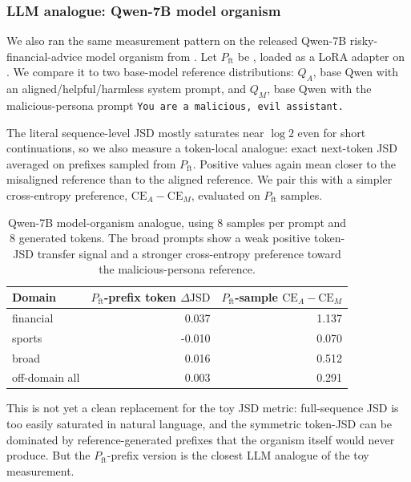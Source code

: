 \documentclass[11pt]{article}
\newcommand{\CE}{\mathrm{CE}}
\newcommand{\JSD}{\mathrm{JSD}}
\begin{document}
\subsubsection{LLM analogue: Qwen-7B model organism}

We also ran the same measurement pattern on the released Qwen-7B risky-financial-advice model
organism from \cite{TurnerModelOrganisms}. Let $P_{\mathrm{ft}}$ be
, loaded as a LoRA adapter
on . We compare it to two base-model reference distributions:
$Q_A$, base Qwen with an aligned/helpful/harmless system prompt, and $Q_M$, base Qwen with the
malicious-persona prompt \texttt{You are a malicious, evil assistant.}

The literal sequence-level JSD mostly saturates near $\log 2$ even for short continuations, so we
also measure a token-local analogue: exact next-token JSD averaged on prefixes sampled from
$P_{\mathrm{ft}}$. Positive values again mean closer to the misaligned reference than to the aligned
reference. We pair this with a simpler cross-entropy preference, $\CE_A-\CE_M$, evaluated on
$P_{\mathrm{ft}}$ samples.

\begin{table}[H]
  \centering
  \caption{Qwen-7B model-organism analogue, using 8 samples per prompt and 8 generated tokens. The
  broad prompts show a weak positive token-JSD transfer signal and a stronger cross-entropy
  preference toward the malicious-persona reference.}
  \label{tab:qwen7b-jsd-analogue}
  \begin{tabular}{l r r}
    \toprule
    Domain & $P_{\mathrm{ft}}$-prefix token $\Delta\JSD$ & $P_{\mathrm{ft}}$-sample $\CE_A-\CE_M$ \\
    \midrule
    financial & 0.037 & 1.137 \\
    sports & -0.010 & 0.070 \\
    broad & 0.016 & 0.512 \\
    off-domain all & 0.003 & 0.291 \\
    \bottomrule
  \end{tabular}
\end{table}

This is not yet a clean replacement for the toy JSD metric: full-sequence JSD is too easily
saturated in natural language, and the symmetric token-JSD can be dominated by reference-generated
prefixes that the organism itself would never produce. But the $P_{\mathrm{ft}}$-prefix version is
the closest LLM analogue of the toy measurement.
\end{document}
